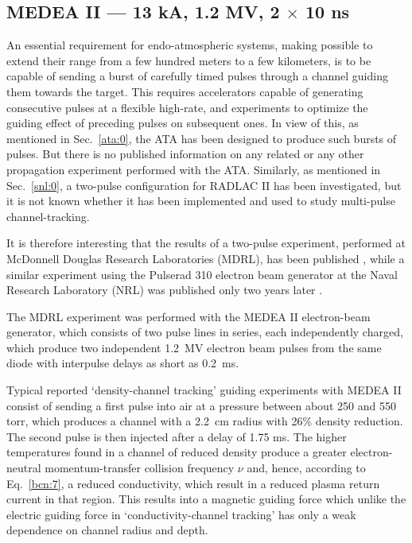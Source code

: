 \documentclass [12pt,a4paper,     ]{report} %
\begin{document}
\subsection{MEDEA II --- 13 kA, 1.2 MV, 2 $\times$ 10 ns}

An essential requirement for endo-atmospheric systems, making possible to extend their range from a few hundred meters to a few kilometers, is to be capable of sending a burst of carefully timed pulses through a channel guiding them towards the target.  This requires accelerators capable of generating consecutive pulses at a flexible high-rate, and experiments to optimize the guiding effect of preceding pulses on subsequent ones.  In view of this, as mentioned in Sec.~\ref{ata:0}, the ATA has been designed to produce such bursts of pulses.  But there is no published information on any related or any other propagation experiment performed with the ATA.  Similarly, as mentioned in Sec.~\ref{snl:0}, a two-pulse configuration for RADLAC II has been investigated, but it is not known whether it has been implemented and used to study multi-pulse channel-tracking. 

  It is therefore interesting that the results of a two-pulse experiment, performed at McDonnell Douglas Research Laboratories (MDRL), has been published \cite{WELCH1990-}, while a similar experiment using the Pulserad 310 electron beam generator at the Naval Research Laboratory (NRL) \cite[Ref.6]{WELCH1990-} was published only two years later \cite{MURPH1992-}.

  The MDRL experiment was performed with the MEDEA II electron-beam generator, which consists of two pulse lines in series, each independently charged, which produce two independent 1.2~MV electron beam pulses from the same diode with interpulse delays as short as 0.2~ms.

  Typical reported `density-channel tracking' guiding experiments with MEDEA II consist of sending a first pulse into air at a pressure between about 250 and 550 torr, which produces a channel with a 2.2~cm radius with 26\% density reduction.  The second pulse is then injected after a delay of 1.75 ms.  The higher temperatures found in a channel of reduced density produce a greater electron-neutral momentum-transfer collision frequency $\nu$ and, hence, according to Eq.~\eqref{bcn:7}, a reduced conductivity, which result in a reduced plasma return current in that region.  This results into a magnetic guiding force which unlike the electric guiding force in `conductivity-channel tracking' has only a weak dependence on channel radius and depth.
\end{document}
